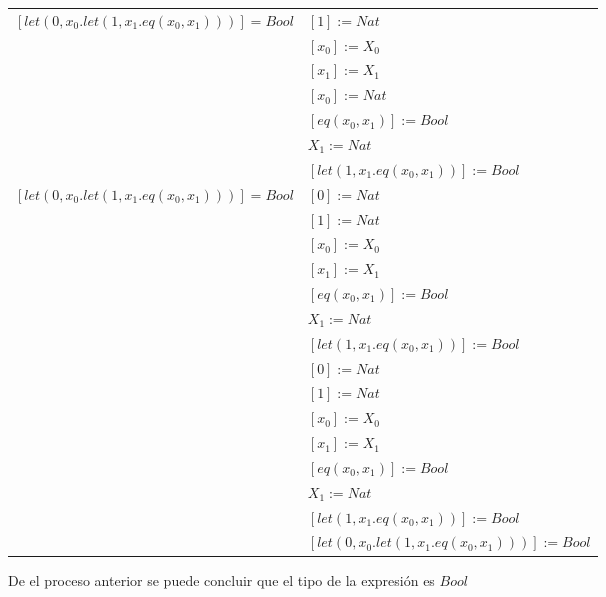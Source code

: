 \begin{exercise}
\begin{description}
\begin{center}
\begin{longtable}{ | l | l | }
                        $[let(0,x_0.let(1,x_1.eq(x_0,x_1)))] = Bool$ & $[1] := Nat$ \\
                        &  $[x_0] := X_0$   \\
                        & $[x_1] := X_1$  \\
                        & $[x_0] := Nat$  \\
                        & $[eq(x_0,x_1)] := Bool$  \\
                        & $X_1 := Nat$\\
                        & $[let(1,x_1.eq(x_0,x_1))] := Bool$ \\
                      \hline
                        $[let(0,x_0.let(1,x_1.eq(x_0,x_1)))] = Bool$ & $[0] := Nat$ \\
                        & $[1] := Nat$ \\
                        & $[x_0] := X_0$ \\
                        & $[x_1] := X_1$ \\
                        & $[eq(x_0,x_1)] := Bool$ \\
                        & $X_1 := Nat$ \\
                        & $[let(1,x_1.eq(x_0,x_1))] := Bool$ \\
                      \hline
                        & $[0] := Nat$ \\
                        & $[1] := Nat$  \\
                        & $[x_0] := X_0$ \\
                        & $[x_1] := X_1$ \\
                        & $[eq(x_0,x_1)] := Bool$ \\
                        & $X_1 := Nat$ \\
                        & $[let(1,x_1.eq(x_0,x_1))] := Bool$ \\
                        & $[let(0,x_0.let(1,x_1.eq(x_0,x_1)))] := Bool$ \\
		\hline
                    \end{longtable}
                \end{center}
        De el proceso anterior se puede concluir que el tipo de la expresión es $Bool$
        \end{description}
    \end{exercise}


